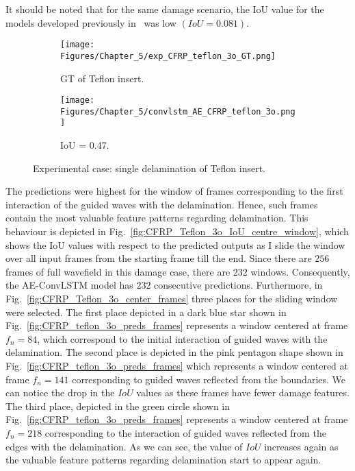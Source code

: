 It should be noted that for the same damage scenario, the IoU value for the models developed previously in~\cite{Ijjeh2021} was low \((IoU=0.081)\).
\begin{figure} [!h]
	\centering
	\begin{subfigure}[b]{0.47\textwidth}
		\centering
		\texttt{[image: Figures/Chapter\_5/exp\_CFRP\_teflon\_3o\_GT.png]}
		\caption{GT of Teflon insert.}
		\label{fig:exp_CFRP_teflon_3o_GT}
	\end{subfigure}
	\begin{subfigure}[b]{0.47\textwidth}
		\centering
		\texttt{[image: Figures/Chapter\_5/convlstm\_AE\_CFRP\_teflon\_3o.png]}
		\caption{IoU = 0.47.}
		\label{fig:convlstm_AE_CFRP_teflon_3o}
	\end{subfigure}
	\caption{Experimental case: single delamination of Teflon insert.}
	\label{fig:exp_Teflon_insert}
\end{figure} 

The predictions were highest for the window of frames corresponding to the first interaction of the guided waves with the delamination.
Hence, such frames contain the most valuable feature patterns regarding delamination. 
This behaviour is depicted in Fig.~\ref{fig:CFRP_Teflon_3o_IoU_centre_window}, which shows the IoU values with respect to the predicted outputs as I slide the window over all input frames from the starting frame till the end.
Since there are \(256\) frames of full wavefield in this damage case, there are \(232\) windows.
Consequently, the AE-ConvLSTM model has \(232\) consecutive predictions.
Furthermore, in Fig.~\ref{fig:CFRP_Teflon_3o_center_frames} three places for the sliding window were selected. 
The first place depicted in a dark blue star shown in Fig.~\ref{fig:CFRP_teflon_3o_preds_frames} represents a window centered at frame \(f_n=84\), which correspond to the initial interaction of guided waves with the delamination.
The second place is depicted in the pink pentagon shape shown in Fig.~\ref{fig:CFRP_teflon_3o_preds_frames} which represents a window centered at frame \(f_n=141\) corresponding to guided waves reflected from the boundaries.
We can notice the drop in the \(IoU\) values as these frames have fewer damage features.
The third place, depicted in the green circle shown in Fig.~\ref{fig:CFRP_teflon_3o_preds_frames} represents a window centered at frame \(f_n=218\) corresponding to the interaction of guided waves reflected from the edges with the delamination.
As we can see, the value of \(IoU\) increases again as the valuable feature patterns regarding delamination start to appear again.

